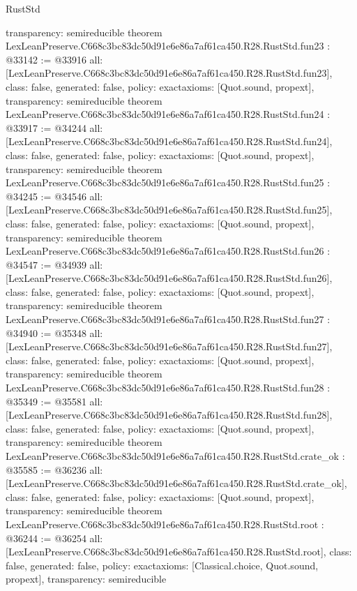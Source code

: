 \begin{lexlean}{RustStd}
\begin{coremodule}
{  transparency: semireducible
}
theorem LexLeanPreserve.C668c3bc83dc50d91e6e86a7af61ca450.R28.RustStd.fun23 : @33142 := @33916 {
  all: [LexLeanPreserve.C668c3bc83dc50d91e6e86a7af61ca450.R28.RustStd.fun23],
  class: false,
  generated: false,
  policy: exact{axioms: [Quot.sound, propext]},
  transparency: semireducible
}
theorem LexLeanPreserve.C668c3bc83dc50d91e6e86a7af61ca450.R28.RustStd.fun24 : @33917 := @34244 {
  all: [LexLeanPreserve.C668c3bc83dc50d91e6e86a7af61ca450.R28.RustStd.fun24],
  class: false,
  generated: false,
  policy: exact{axioms: [Quot.sound, propext]},
  transparency: semireducible
}
theorem LexLeanPreserve.C668c3bc83dc50d91e6e86a7af61ca450.R28.RustStd.fun25 : @34245 := @34546 {
  all: [LexLeanPreserve.C668c3bc83dc50d91e6e86a7af61ca450.R28.RustStd.fun25],
  class: false,
  generated: false,
  policy: exact{axioms: [Quot.sound, propext]},
  transparency: semireducible
}
theorem LexLeanPreserve.C668c3bc83dc50d91e6e86a7af61ca450.R28.RustStd.fun26 : @34547 := @34939 {
  all: [LexLeanPreserve.C668c3bc83dc50d91e6e86a7af61ca450.R28.RustStd.fun26],
  class: false,
  generated: false,
  policy: exact{axioms: [Quot.sound, propext]},
  transparency: semireducible
}
theorem LexLeanPreserve.C668c3bc83dc50d91e6e86a7af61ca450.R28.RustStd.fun27 : @34940 := @35348 {
  all: [LexLeanPreserve.C668c3bc83dc50d91e6e86a7af61ca450.R28.RustStd.fun27],
  class: false,
  generated: false,
  policy: exact{axioms: [Quot.sound, propext]},
  transparency: semireducible
}
theorem LexLeanPreserve.C668c3bc83dc50d91e6e86a7af61ca450.R28.RustStd.fun28 : @35349 := @35581 {
  all: [LexLeanPreserve.C668c3bc83dc50d91e6e86a7af61ca450.R28.RustStd.fun28],
  class: false,
  generated: false,
  policy: exact{axioms: [Quot.sound, propext]},
  transparency: semireducible
}
theorem LexLeanPreserve.C668c3bc83dc50d91e6e86a7af61ca450.R28.RustStd.crate_ok : @35585 := @36236 {
  all: [LexLeanPreserve.C668c3bc83dc50d91e6e86a7af61ca450.R28.RustStd.crate_ok],
  class: false,
  generated: false,
  policy: exact{axioms: [Quot.sound, propext]},
  transparency: semireducible
}
theorem LexLeanPreserve.C668c3bc83dc50d91e6e86a7af61ca450.R28.RustStd.root : @36244 := @36254 {
  all: [LexLeanPreserve.C668c3bc83dc50d91e6e86a7af61ca450.R28.RustStd.root],
  class: false,
  generated: false,
  policy: exact{axioms: [Classical.choice, Quot.sound, propext]},
  transparency: semireducible
}


\end{coremodule}
\end{lexlean}
